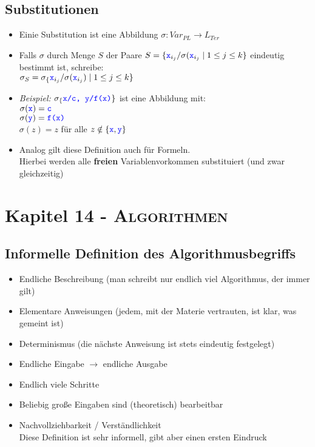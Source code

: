 \documentclass{article}
\newcommand{\kapitel}[2]{Kapitel #1 - \textsc{#2}}
\newcommand{\blue}[1]{\textcolor{blue}{#1}}
\newcommand{\strongColor}[1]{\textcolor{strongColor}{#1}}
\newcommand{\strong}[1]{\textbf{\strongColor{#1}}}
\newcommand{\important}[1]{\textcolor{importantColor}{#1}}
\newcommand{\example}[1]{\textit{Beispiel: }#1}
\newcommand{\word}[1]{\blue{\texttt{#1}}}
\newcommand{\set}[1]{\{#1\}}
\begin{document}
\subsection{Substitutionen}
\begin{itemize}
    \item Einie \important{Substitution} ist eine Abbildung $\sigma: Var_{PL} \to L_{Ter}$
    \item Falls $\sigma$ durch Menge $S$ der Paare $S=\set{\word{x}_{i_j} / \sigma(\word{x}_{i_j} \mid 1 \leq j \leq k}$ eindeutig bestimmt ist, schreibe:\\
    $\sigma_S = \sigma_\set{\word{x}_{i_j} / \sigma(\word{x}_{i_j}) \mid 1\leq j\leq k}$
    \item \example{$\sigma_\set{\word{x/c, y/f(x)}}$ ist eine Abbildung mit: \\
    $\sigma(\word{x})=\word{c}$\\
    $\sigma(\word{y})=\word{f(x)}$\\
    $\sigma(z)=z$ für alle $z\notin\set{\word{x}, \word{y}}$}
    \item Analog gilt diese Definition auch für Formeln.\\
    Hierbei werden alle \strong{freien} Variablenvorkommen substituiert (und zwar \important{gleichzeitig})
\end{itemize}
\newpage

\section{\kapitel{14}{Algorithmen}}
\subsection{Informelle Definition des Algorithmusbegriffs}
\begin{itemize}
    \item Endliche Beschreibung (man schreibt nur endlich viel Algorithmus, der immer gilt)
    \item Elementare Anweisungen (jedem, mit der Materie vertrauten, ist klar, was gemeint ist)
    \item Determinismus (die nächste Anweisung ist stets eindeutig festgelegt)
    \item Endliche Eingabe $\longrightarrow$ endliche Ausgabe
    \item Endlich viele Schritte
    \item Beliebig große Eingaben sind (theoretisch) bearbeitbar
    \item Nachvollziehbarkeit / Verständlichkeit\\
    \important{Diese Definition ist sehr informell, gibt aber einen ersten Eindruck}
\end{itemize}
\end{document}
